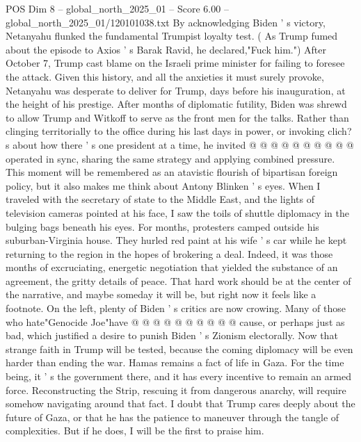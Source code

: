 \begin{textsample}{POS Dim 8 – global\_north\_2025\_01 – Score 6.00 – global\_north\_2025\_01/120101038.txt}
By acknowledging Biden ' s victory, Netanyahu flunked the fundamental Trumpist loyalty test. ( As Trump fumed about the episode to Axios ' s Barak Ravid, he declared,"Fuck him.") After October 7, Trump cast blame on the Israeli prime minister for failing to foresee the attack.
Given this history, and all the anxieties it must surely provoke, Netanyahu was desperate to deliver for Trump, days before his inauguration, at the height of his prestige.
After months of diplomatic futility, Biden was shrewd to allow Trump and Witkoff to serve as the front men for the talks.
Rather than clinging territorially to the office during his last days in power, or invoking clich? s about how there ' s one president at a time, he invited @ @ @ @ @ @ @ @ @ @ operated in sync, sharing the same strategy and applying combined pressure.
This moment will be remembered as an atavistic flourish of bipartisan foreign policy, but it also makes me think about Antony Blinken ' s eyes.
When I traveled with the secretary of state to the Middle East, and the lights of television cameras pointed at his face, I saw the toils of shuttle diplomacy in the bulging bags beneath his eyes.
For months, protesters camped outside his suburban-Virginia house.
They hurled red paint at his wife ' s car while he kept returning to the region in the hopes of brokering a deal.
Indeed, it was those months of excruciating, energetic negotiation that yielded the substance of an agreement, the gritty details of peace.
That hard work should be at the center of the narrative, and maybe someday it will be, but right now it feels like a footnote.
On the left, plenty of Biden ' s critics are now crowing.
Many of those who hate"Genocide Joe"have @ @ @ @ @ @ @ @ @ @ cause, or perhaps just as bad, which justified a desire to punish Biden ' s Zionism electorally.
Now that strange faith in Trump will be tested, because the coming diplomacy will be even harder than ending the war.
Hamas remains a fact of life in Gaza.
For the time being, it ' s the government there, and it has every incentive to remain an armed force.
Reconstructing the Strip, rescuing it from dangerous anarchy, will require somehow navigating around that fact.
I doubt that Trump cares deeply about the future of Gaza, or that he has the patience to maneuver through the tangle of complexities.
But if he does, I will be the first to praise him.

\end{textsample}
